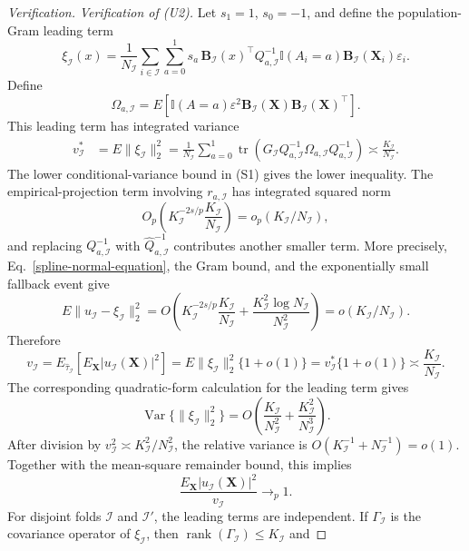 \documentclass[11pt]{article}
\theoremstyle{referenceplain}
\theoremstyle{referencedefinition}
\theoremstyle{referenceremark}
\begin{document}
\begin{proof}[Verification]
\medskip\noindent\textit{Verification of (U2).}
Let $s_1=1$, $s_0=-1$, and define the population-Gram leading term
\[
\xi_{\mathcal I}(x)
=\frac1{N_{\mathcal I}}
\sum_{i\in\mathcal I}\sum_{a=0}^1
s_a\,\mathbf B_{\mathcal I}(x)^\top Q_{a,\mathcal I}^{-1}
\mathbb I(A_i=a)\mathbf B_{\mathcal I}(\mathbf X_i)\varepsilon_i.
\]
Define
\[
\Omega_{a,\mathcal I}
=E\left[\mathbb I(A=a)\varepsilon^2
\mathbf B_{\mathcal I}(\mathbf X)
\mathbf B_{\mathcal I}(\mathbf X)^\top\right].
\]
This leading term has integrated variance
\begin{align}
v_{\mathcal I}^{*}
&=E\|\xi_{\mathcal I}\|_2^2
=\frac1{N_{\mathcal I}}
\sum_{a=0}^1\operatorname{tr}\left(
G_{\mathcal I}Q_{a,\mathcal I}^{-1}
\Omega_{a,\mathcal I}Q_{a,\mathcal I}^{-1}\right)
\asymp\frac{K_{\mathcal I}}{N_{\mathcal I}}.
\label{spline-integrated-variance}
\end{align}
The lower conditional-variance bound in (S1) gives the lower inequality. The empirical-projection term involving $r_{a,\mathcal I}$ has integrated squared norm
\[
O_p\left(K_{\mathcal I}^{-2s/p}
\frac{K_{\mathcal I}}{N_{\mathcal I}}\right)
=o_p(K_{\mathcal I}/N_{\mathcal I}),
\]
and replacing $Q_{a,\mathcal I}^{-1}$ with
$\widehat Q_{a,\mathcal I}^{-1}$ contributes another smaller term. More
precisely, Eq.~\eqref{spline-normal-equation}, the Gram bound, and the
exponentially small fallback event give
\[
E\|u_{\mathcal I}-\xi_{\mathcal I}\|_2^2
=O\left(
K_{\mathcal I}^{-2s/p}\frac{K_{\mathcal I}}{N_{\mathcal I}}
+\frac{K_{\mathcal I}^2\log N_{\mathcal I}}{N_{\mathcal I}^2}
\right)
=o(K_{\mathcal I}/N_{\mathcal I}).
\]
Therefore
\[
v_{\mathcal I}
=E_{\widehat\tau_{\mathcal I}}\left[
E_{\mathbf X}|u_{\mathcal I}(\mathbf X)|^2
\right]
=E\|\xi_{\mathcal I}\|_2^2\{1+o(1)\}
=v_{\mathcal I}^{*}\{1+o(1)\}
\asymp\frac{K_{\mathcal I}}{N_{\mathcal I}}.
\]
The corresponding quadratic-form calculation for the leading term gives
\[
\operatorname{Var}\{\|\xi_{\mathcal I}\|_2^2\}
=O\left(\frac{K_{\mathcal I}}{N_{\mathcal I}^2}
+\frac{K_{\mathcal I}^2}{N_{\mathcal I}^3}\right).
\]
After division by $v_{\mathcal I}^2\asymp K_{\mathcal I}^2/N_{\mathcal I}^2$, the relative variance is
$O(K_{\mathcal I}^{-1}+N_{\mathcal I}^{-1})=o(1)$. Together with the
mean-square remainder bound, this implies
\[
\frac{E_{\mathbf X}|u_{\mathcal I}(\mathbf X)|^2}{v_{\mathcal I}}
\longrightarrow_p1.
\]
For disjoint folds $\mathcal I$ and $\mathcal I'$, the leading terms are
independent. If $\Gamma_{\mathcal I}$ is the covariance operator of
$\xi_{\mathcal I}$, then
$\operatorname{rank}(\Gamma_{\mathcal I})\le K_{\mathcal I}$ and

\end{proof}
\end{document}
